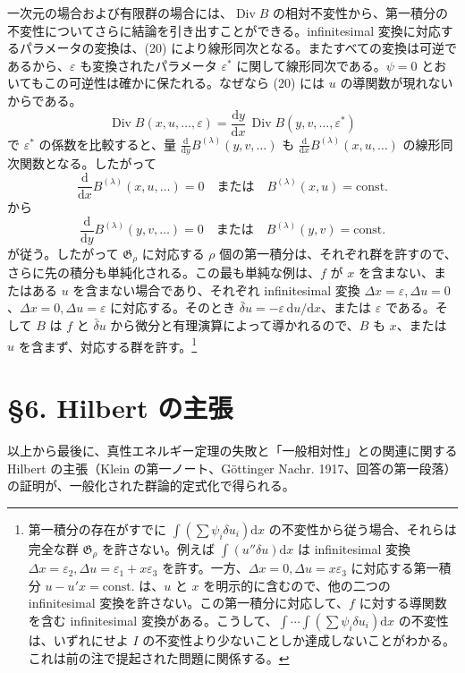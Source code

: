 \documentclass[11pt]{article}
\newcommand{\D}{\Delta}
\newcommand{\eps}{\varepsilon}
\providecommand{\dd}{\mathrm d}
\providecommand{\Div}{\operatorname{Div}}
\providecommand{\G}{\mathfrak G}
\providecommand{\bd}{\bar{\delta}}
\begin{document}
一次元の場合および有限群の場合には、\(\Div B\) の相対不変性から、第一積分の不変性についてさらに結論を引き出すことができる。infinitesimal 変換に対応するパラメータの変換は、(20) により線形同次となる。またすべての変換は可逆であるから、\(\eps\) も変換されたパラメータ \(\eps^*\) に関して線形同次である。\(\psi=0\) とおいてもこの可逆性は確かに保たれる。なぜなら (20) には \(u\) の導関数が現れないからである。
\[
\Div B(x,u,\ldots,\eps)=\frac{\dd y}{\dd x}\,\Div B(y,v,\ldots,\eps^*)
\]
で \(\eps^*\) の係数を比較すると、量 \(\frac{\dd}{\dd y}B^{(\lambda)}(y,v,\ldots)\) も \(\frac{\dd}{\dd x}B^{(\lambda)}(x,u,\ldots)\) の線形同次関数となる。したがって
\[
\frac{\dd}{\dd x}B^{(\lambda)}(x,u,\ldots)=0
\quad\text{または}\quad B^{(\lambda)}(x,u)=\mathrm{const.}
\]
から
\[
\frac{\dd}{\dd y}B^{(\lambda)}(y,v,\ldots)=0
\quad\text{または}\quad B^{(\lambda)}(y,v)=\mathrm{const.}
\]
が従う。したがって \(\G_\rho\) に対応する \(\rho\) 個の第一積分は、それぞれ群を許すので、さらに先の積分も単純化される。この最も単純な例は、\(f\) が \(x\) を含まない、またはある \(u\) を含まない場合であり、それぞれ infinitesimal 変換 \(\D x=\eps,\D u=0\)、\(\D x=0,\D u=\eps\) に対応する。そのとき \(\bd u=-\eps\,\dd u/\dd x\)、または \(\eps\) である。そして \(B\) は \(f\) と \(\bd u\) から微分と有理演算によって導かれるので、\(B\) も \(x\)、または \(u\) を含まず、対応する群を許す。\footnote{第一積分の存在がすでに \(\int(\sum\psi_i\delta u_i)\dd x\) の不変性から従う場合、それらは完全な群 \(\G_\rho\) を許さない。例えば \(\int(u''\delta u)\dd x\) は infinitesimal 変換 \(\D x=\eps_2,\D u=\eps_1+x\eps_3\) を許す。一方、\(\D x=0,\D u=x\eps_3\) に対応する第一積分 \(u-u'x=\mathrm{const.}\) は、\(u\) と \(x\) を明示的に含むので、他の二つの infinitesimal 変換を許さない。この第一積分に対応して、\(f\) に対する導関数を含む infinitesimal 変換がある。こうして、\(\int\!\cdots\!\int(\sum\psi_i\delta u_i)\dd x\) の不変性は、いずれにせよ \(I\) の不変性より少ないことしか達成しないことがわかる。これは前の注で提起された問題に関係する。}

\section*{\S{}6. Hilbert の主張}

以上から最後に、真性エネルギー定理の失敗と「一般相対性」との関連に関する Hilbert の主張（Klein の第一ノート、Göttinger Nachr. 1917、回答の第一段落）の証明が、一般化された群論的定式化で得られる。
\end{document}
